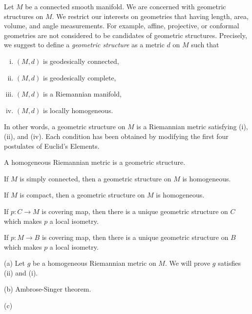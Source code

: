 \documentclass{../note}
\begin{document}
\begin{prb}
Let $M$ be a connected smooth manifold.
We are concerned with geometric structures on $M$.
We restrict our interests on geometries that having length, area, volume, and angle measurements.
For example, affine, projective, or conformal geometries are not considered to be candidates of geometric structures.
Precisely, we suggest to define a \emph{geometric structure} as a metric $d$ on $M$ such that
\begin{enumerate}[(i)]
\item $(M,d)$ is geodesically connected,
\item $(M,d)$ is geodesically complete,
\item $(M,d)$ is a Riemannian manifold,
\item $(M,d)$ is locally homogeneous.
\end{enumerate}
In other words, a geometric structure on $M$ is a Riemannian metric satisfying (i), (ii), and (iv).
Each condition has been obtained by modifying the first four postulates of Euclid's Elements.
\begin{parts}
\item A homogeneous Riemannian metric is a geometric structure.
\item If $M$ is simply connected, then a geometric structure on $M$ is homogeneous.
\item If $M$ is compact, then a geometric structure on $M$ is homogeneous.
\item If $p:C\to M$ is covering map, then there is a unique geometric structure on $C$ which makes $p$ a local isometry.
\item If $p:M\to B$ is covering map, then there is a unique geometric structure on $B$ which makes $p$ a local isometry.
\end{parts}
\end{prb}
\begin{pf}
(a)
Let $g$ be a homogeneous Riemannian metric on $M$.
We will prove $g$ satisfies (ii) and (i).

(b) %
Ambrose-Singer theorem.

(c)
\end{pf}
\end{document}
